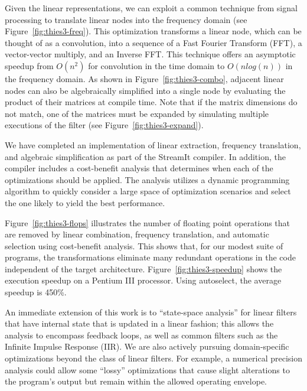 \documentclass{csailabstractbook}
\begin{document}
\clearpage
Given the linear representations, we can exploit a common technique
from signal processing to translate linear nodes into the frequency
domain (see Figure~\ref{fig:thies3-freq}).  This optimization
transforms a linear node, which can be thought of as a convolution,
into a sequence of a Fast Fourier Transform (FFT), a vector-vector
multiply, and an Inverse FFT.  This technique offers an asymptotic
speedup from $O(n^2)$ for convolution in the time domain to $O(n
log(n))$ in the frequency domain.  As shown in
Figure~\ref{fig:thies3-combo}, adjacent linear nodes can also be
algebraically simplified into a single node by evaluating the product
of their matrices at compile time.  Note that if the matrix dimensions
do not match, one of the matrices must be expanded by simulating
multiple executions of the filter (see
Figure~\ref{fig:thies3-expand}).


We have completed an implementation of linear extraction, frequency
translation, and algebraic simplification as part of the StreamIt
compiler.  In addition, the compiler includes a cost-benefit analysis
that determines when each of the optimizations should be applied.  The
analysis utilizes a dynamic programming algorithm to quickly consider
a large space of optimization scenarios and select the one likely to
yield the best performance.

Figure~\ref{fig:thies3-flops} illustrates the number of floating point
operations that are removed by linear combination, frequency
translation, and automatic selection using cost-benefit analysis.
This shows that, for our modest suite of programs, the transformations
eliminate many redundant operations in the code independent of the
target architecture.  Figure~\ref{fig:thies3-speedup} shows the
execution speedup on a Pentium III processor.  Using autoselect, the
average speedup is 450\%.

 An immediate extension of this work is to
``state-space analysis'' for linear filters that have internal state
that is updated in a linear fashion; this allows the analysis to
encompass feedback loops, as well as common filters such as the
Infinite Impulse Response (IIR).  We are also actively pursuing
domain-specific optimizations beyond the class of linear filters.  For
example, a numerical precision analysis could allow some ``lossy''
optimizations that cause slight alterations to the program's output
but remain within the allowed operating envelope.
\end{document}
